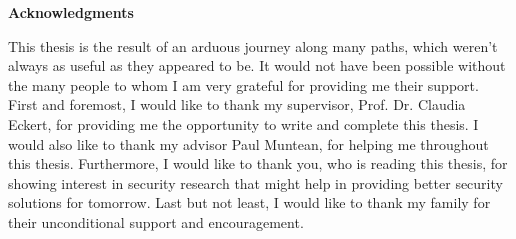 \clearemptydoublepage
{}
{}	



\vspace*{2cm}

\begin{center}
{\Large \bf Acknowledgments}
\end{center}
\vspace{1cm}
This thesis is the result of an arduous journey along many paths, which weren't always as useful as they appeared to be. It would not have been possible without the many people to whom I am very grateful for providing me their support. First and foremost, I would like to thank my supervisor, Prof. Dr. Claudia Eckert, for providing me the opportunity to write and complete this thesis. I would also like to thank my advisor Paul Muntean, for helping me throughout this thesis.  Furthermore, I would like to thank you, who is reading this thesis, for showing interest in security research that might help in providing better security solutions for tomorrow. Last but not least, I would like to thank my family for their unconditional support and encouragement.